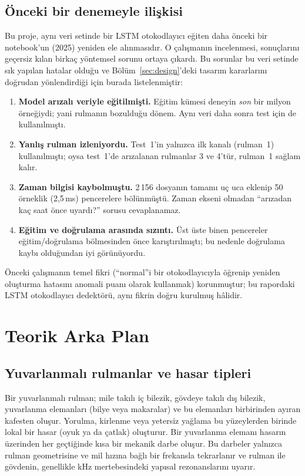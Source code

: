 \documentclass[11pt]{article}
\begin{document}
\subsection{Önceki bir denemeyle ilişkisi}
Bu proje, aynı veri setinde bir LSTM otokodlayıcı eğiten daha önceki bir notebook'un (2025) yeniden ele
alınmasıdır. O çalışmanın incelenmesi, sonuçlarını geçersiz kılan birkaç yöntemsel sorunu ortaya
çıkardı. Bu sorunlar bu veri setinde sık yapılan hatalar olduğu ve Bölüm~\ref{sec:design}'deki tasarım
kararlarını doğrudan yönlendirdiği için burada listelenmiştir:
\begin{enumerate}
  \item \textbf{Model arızalı veriyle eğitilmişti.} Eğitim kümesi deneyin \emph{son} bir milyon
        örneğiydi; yani rulmanın bozulduğu dönem. Aynı veri daha sonra test için de kullanılmıştı.
  \item \textbf{Yanlış rulman izleniyordu.} Test~1'in yalnızca ilk kanalı (rulman~1) kullanılmıştı;
        oysa test~1'de arızalanan rulmanlar 3 ve 4'tür, rulman~1 sağlam kalır.
  \item \textbf{Zaman bilgisi kaybolmuştu.} 2\,156 dosyanın tamamı uç uca eklenip 50 örneklik (2,5\,ms)
        pencerelere bölünmüştü. Zaman ekseni olmadan ``arızadan kaç saat önce uyardı?'' sorusu
        cevaplanamaz.
  \item \textbf{Eğitim ve doğrulama arasında sızıntı.} Üst üste binen pencereler eğitim/doğrulama
        bölmesinden önce karıştırılmıştı; bu nedenle doğrulama kaybı olduğundan iyi görünüyordu.
\end{enumerate}
Önceki çalışmanın temel fikri (``normal''i bir otokodlayıcıyla öğrenip yeniden oluşturma hatasını
anomali puanı olarak kullanmak) korunmuştur; bu rapordaki LSTM otokodlayıcı dedektörü, aynı fikrin
doğru kurulmuş hâlidir.

\section{Teorik Arka Plan}

\subsection{Yuvarlanmalı rulmanlar ve hasar tipleri}
Bir yuvarlanmalı rulman; mile takılı iç bilezik, gövdeye takılı dış bilezik, yuvarlanma elemanları
(bilye veya makaralar) ve bu elemanları birbirinden ayıran kafesten oluşur. Yorulma, kirlenme veya
yetersiz yağlama bu yüzeylerden birinde lokal bir hasar (oyuk ya da çatlak) oluşturur. Bir yuvarlanma
elemanı hasarın üzerinden her geçtiğinde kısa bir mekanik darbe oluşur. Bu darbeler yalnızca rulman
geometrisine ve mil hızına bağlı bir frekansla tekrarlanır ve rulman ile gövdenin, genellikle kHz
mertebesindeki yapısal rezonanslarını uyarır.
\end{document}
